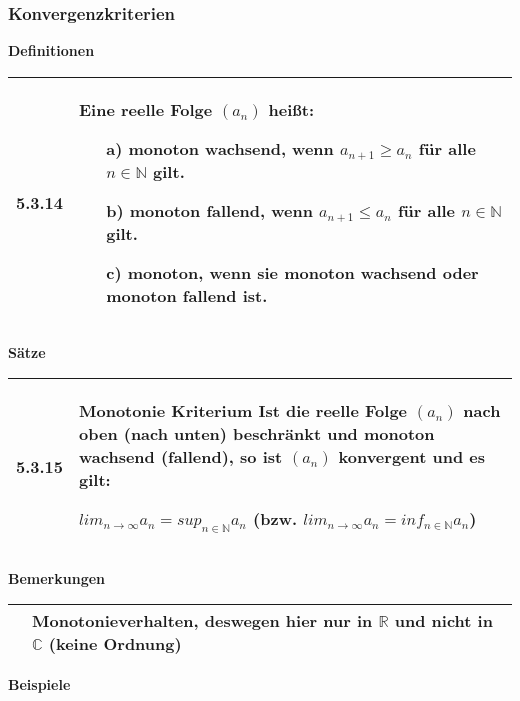 \subsubsection{Konvergenzkriterien}

\noindent
\textbf{Definitionen}
\begin{table}[H]  
\begin{tabularx}{\textwidth}{X m{16cm}}
    \toprule
    
    5.3.14& Eine reelle Folge $(a_n)$ heißt:
            \begin{itemize}[topsep=-0.5cm]
                \item[a)] \textbf{monoton wachsend}, wenn $a_{n+1} \geq a_n$ für alle $n \in \mathbb{N}$ gilt.
                \item[b)] \textbf{monoton fallend}, wenn $a_{n+1} \leq a_n$ für alle $n \in \mathbb{N}$ gilt.
                \item[c)] \textbf{monoton}, wenn sie monoton wachsend oder monoton fallend ist. 
            \end{itemize} \vspace{-0cm} \\

    \bottomrule
    
\end{tabularx}
\end{table}

\noindent 
\textbf{Sätze}
\begin{table}[H]
\begin{tabularx}{\textwidth}{X m{16cm}}
    \toprule

    5.3.15& \textbf{Monotonie Kriterium} \hfill \break
            Ist die reelle Folge $(a_n)$ nach oben (nach unten) beschränkt und monoton wachsend (fallend), so ist $(a_n)$ \textbf{konvergent}
            und es gilt: \hfill \break
            \centerline{$lim_{n \rightarrow \infty} a_n = sup_{n \in \mathbb{N}}a_n$ (bzw. $lim_{n \rightarrow \infty} a_n = inf_{n \in \mathbb{N}}a_n$) } \\

    \bottomrule
\end{tabularx}
\end{table}

\noindent
\textbf{Bemerkungen}
\begin{table}[H]
\begin{tabularx}{\textwidth}{X m{16cm}}
    \toprule

          & Monotonieverhalten, deswegen hier nur in $\mathbb{R}$ und nicht in $\mathbb{C}$ (keine Ordnung) \\
          
    \bottomrule
\end{tabularx}
\end{table}

\noindent
\textbf{Beispiele}
\begin{table}[h]
\begin{tabularx}{\textwidth}{X m{16cm}}
    \toprule

    & \\

    \bottomrule
\end{tabularx}
\end{table}
